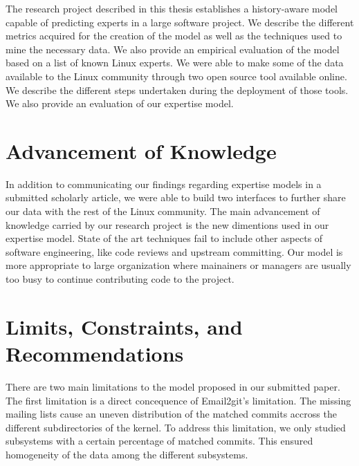 \label{sec:Conclusion}


The research project described in this thesis establishes a history-aware model capable of predicting experts in a large software project. We describe the different metrics acquired for the creation of the model as well as the techniques used to mine the necessary data. We also provide an empirical evaluation of the model based on a list of known Linux experts. We were able to make some of the data available to the Linux community through two open source tool available online. We describe the different steps undertaken during the deployment of those tools. We also provide an evaluation of our expertise model.


\section{Advancement of Knowledge}


In addition to communicating our findings regarding expertise models in a submitted scholarly article, we were able to build two interfaces to further share our data with the rest of the Linux community. The main advancement of knowledge carried by our research project is the new dimentions used in our expertise model. State of the art techniques fail to include other aspects of software engineering, like code reviews and upstream committing. Our model is more appropriate to large organization where mainainers or managers are usually too busy to continue contributing code to the project. 

\section{Limits, Constraints, and Recommendations}







There are two main limitations to the model proposed in our submitted paper. The first limitation is a direct concequence of Email2git's limitation. The missing mailing lists cause an uneven distribution of the matched commits accross the different subdirectories of the kernel. To address this limitation, we only studied subsystems with a certain percentage of matched commits. This ensured homogeneity of the data among the different subsystems. 

